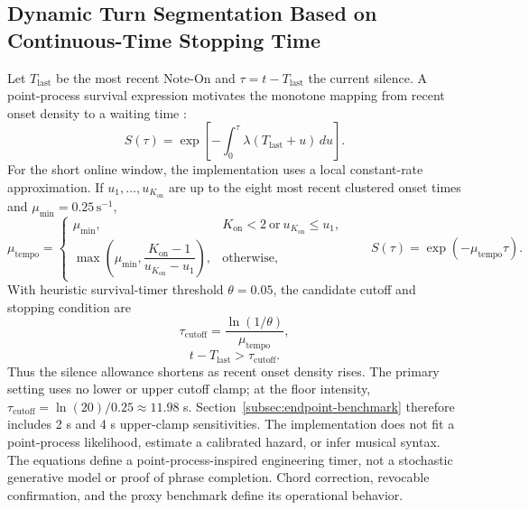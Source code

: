 \documentclass[11pt,a4paper]{article}
\begin{document}
\subsection{Dynamic Turn Segmentation Based on Continuous-Time Stopping Time}

Let $T_{\mathrm{last}}$ be the most recent Note-On and $\tau=t-T_{\mathrm{last}}$ the current silence. A point-process survival expression motivates the monotone mapping from recent onset density to a waiting time \citep{daley2003pointprocesses}:
\begin{equation}
S(\tau)=\exp\left[-\int_0^{\tau}\lambda(T_{\mathrm{last}}+u)\,du\right].
\end{equation}
For the short online window, the implementation uses a local constant-rate approximation. If $u_1,\ldots,u_{K_{\mathrm{on}}}$ are up to the eight most recent clustered onset times and $\mu_{\min}=0.25\,\mathrm{s}^{-1}$,
\begin{equation}
\mu_{\mathrm{tempo}}=
\begin{cases}
\mu_{\min}, & K_{\mathrm{on}}<2\ \text{or}\ u_{K_{\mathrm{on}}}\leq u_1,\\
\max\left(\mu_{\min},\dfrac{K_{\mathrm{on}}-1}{u_{K_{\mathrm{on}}}-u_1}\right), & \text{otherwise},
\end{cases}
\qquad
S(\tau)=\exp(-\mu_{\mathrm{tempo}}\tau).
\end{equation}
With heuristic survival-timer threshold $\theta=0.05$, the candidate cutoff and stopping condition are
\begin{equation}
\tau_{\mathrm{cutoff}}=\frac{\ln(1/\theta)}{\mu_{\mathrm{tempo}}},
\label{eq:dynamic-cutoff}
\end{equation}
\begin{equation}
t-T_{\mathrm{last}}>\tau_{\mathrm{cutoff}}.
\label{eq:endpoint-condition}
\end{equation}
Thus the silence allowance shortens as recent onset density rises. The primary setting uses no lower or upper cutoff clamp; at the floor intensity, $\tau_{\mathrm{cutoff}}=\ln(20)/0.25\approx11.98$ s. Section~\ref{subsec:endpoint-benchmark} therefore includes 2 s and 4 s upper-clamp sensitivities. The implementation does not fit a point-process likelihood, estimate a calibrated hazard, or infer musical syntax. The equations define a point-process-inspired engineering timer, not a stochastic generative model or proof of phrase completion. Chord correction, revocable confirmation, and the proxy benchmark define its operational behavior.
\end{document}
